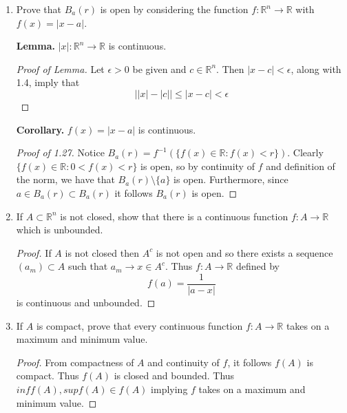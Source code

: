 \begin{enumerate}
    \item[1.27] Prove that \( B_a(r) \) is open by considering the function \( f: \mathbb{R}^n \rightarrow \mathbb{R} \) with \( f(x) = \left| x-a \right| \).
    
    \textbf{Lemma.} \( \left| x \right|: \mathbb{R}^n \rightarrow \mathbb{R} \) is continuous.
    \begin{proof}[Proof of Lemma]
    Let \( \epsilon > 0 \) be given and \( c \in \mathbb{R}^n \). Then \( \left| x-c \right| < \epsilon \), along with 1.4, imply that
    \[
    \left| \left| x \right| - \left| c \right| \right| \leq \left| x-c \right| < \epsilon
    \]
    \end{proof}
    
    \textbf{Corollary.} \( f(x) = \left| x-a \right| \) is continuous.
    
    \begin{proof}[Proof of 1.27]
     Notice \( B_a(r) = f^{-1}\left( \{ f(x) \in \mathbb{R}: f(x) < r \} \right) \). Clearly \( \{ f(x) \in \mathbb{R}: 0< f(x) < r \} \) is open, so by continuity of \( f \) and definition of the norm, we have that \( B_a(r) \setminus \{ a \} \) is open. Furthermore, since \( a \in B_a(r) \subset B_a(r) \) it follows \( B_a(r) \) is open.
    \end{proof}
    
    \item[1.28] If \( A \subset \mathbb{R}^n \) is not closed, show that there is a continuous function \( f:A \rightarrow \mathbb{R} \) which is unbounded.
    
    \begin{proof}
    If \( A \) is not closed then \( A^c \) is not open and so there exists a sequence \( (a_m) \subset A \) such that \( a_m \rightarrow x \in A^c \). Thus \( f:A \rightarrow \mathbb{R} \) defined by
    \[
    f(a) = \frac{1}{\left| a-x \right|}
    \]
    is continuous and unbounded.
    \end{proof}
    
    \item[1.29] If \( A \) is compact, prove that every continuous function \( f:A \rightarrow \mathbb{R} \) takes on a maximum and minimum value.
    
    \begin{proof}
    From compactness of \( A \) and continuity of \( f \), it follows \( f(A) \) is compact. Thus \( f(A) \) is closed and bounded. Thus \( inf f(A) , sup f(A) \in f(A) \) implying \( f \) takes on a maximum and minimum value.
    \end{proof}
    

\end{enumerate}
